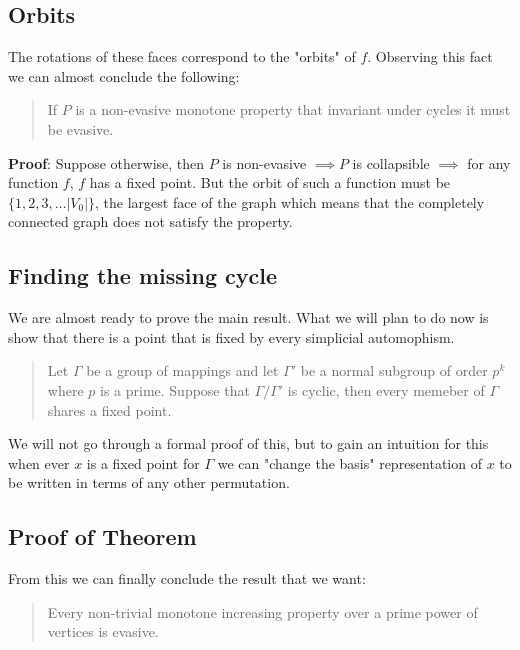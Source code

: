 \documentclass[letterpaper,12pt]{article}
\begin{document}
\subsection{Orbits}

The rotations of these faces correspond to the "orbits" of $f$. Observing this fact we can almost conclude the following:

\begin{quote}
    If $P$ is a non-evasive monotone property that invariant under cycles it must be evasive.
\end{quote}

\textbf{Proof}: Suppose otherwise, then $P$ is non-evasive $\implies P$ is collapsible $\implies$ for any function $f$, $f$ has a fixed point. But the orbit of such a function must be $\{1, 2, 3, \ldots |V_0| \}$, the largest face of the graph which means that the completely connected graph does not satisfy the property.

\subsection{Finding the missing cycle}

We are almost ready to prove the main result. What we will plan to do now is show that there is a point that is fixed by every simplicial automophism.

\begin{quote}
    Let $\Gamma$ be a group of mappings and let $\Gamma'$ be a normal subgroup of order $p^k$ where $p$ is a prime. Suppose that $\Gamma/\Gamma'$ is cyclic, then every memeber of $\Gamma$ shares a fixed point.
\end{quote}

We will not go through a formal proof of this, but to gain an intuition for this when ever $x$ is a fixed point for $\Gamma$ we can "change the basis" representation of $x$ to be written in terms of any other permutation.

\subsection{Proof of Theorem}

From this we can finally conclude the result that we want:

\begin{quote}
    Every non-trivial monotone increasing property over a prime power of vertices is evasive.
\end{quote}
\end{document}
